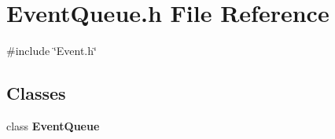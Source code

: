 \section{Event\+Queue.\+h File Reference}
\label{EventQueue_8h}
{\ttfamily \#include \char`\"{}Event.\+h\char`\"{}}\newline
\subsection*{Classes}
\begin{DoxyCompactItemize}
\item 
class \textbf{ Event\+Queue}
\end{DoxyCompactItemize}
